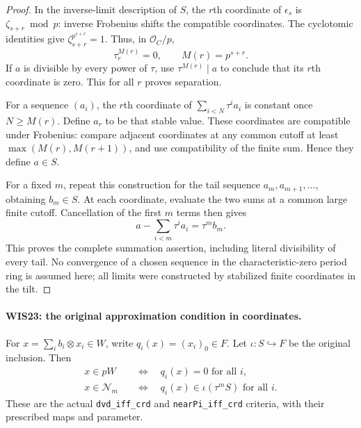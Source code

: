 \documentclass[11pt,a4paper]{article}
\numberwithin{equation}{section}
\theoremstyle{remark}\newtheorem{remark}[theorem]{Remark}
\begin{document}
\begin{proof}
In the inverse-limit description of $S$, the $r$th
coordinate of $\epsilon_s$ is
$\zeta_{s+r}\bmod p$: inverse Frobenius shifts the
compatible coordinates. The cyclotomic identities give
$\zeta_{s+r}^{p^{s+r}}=1$. Thus, in $\mathcal O_C/p$,
\[
                   \tau_r^{M(r)}=0,\qquad M(r)=p^{s+r}.
                                                               \tag{WIS.34}
\]
If $a$ is divisible by every power of $\tau$, use
$\tau^{M(r)}\mid a$ to conclude that its $r$th
coordinate is zero. This for all $r$ proves separation.

For a sequence $(a_i)$, the $r$th coordinate of
$\sum_{i<N}\tau^ia_i$ is constant once $N\geq M(r)$.
Define $a_r$ to be that stable value. These coordinates
are compatible under Frobenius: compare adjacent
coordinates at any common cutoff at least
$\max(M(r),M(r+1))$, and use compatibility of the
finite sum. Hence they define $a\in S$.

For a fixed $m$, repeat this construction for the tail
sequence $a_m,a_{m+1},\ldots$, obtaining $b_m\in S$.
At each coordinate, evaluate the two sums at a common
large finite cutoff. Cancellation of the first $m$
terms then gives
\[
                     a-\sum_{i<m}\tau^ia_i=\tau^m b_m.
 \tag{WIS.35}
\]
This proves the complete summation assertion, including
literal divisibility of every tail. No convergence of
a chosen sequence in the characteristic-zero period
ring is assumed here; all limits were constructed
by stabilized finite coordinates in the tilt.
\end{proof}

\paragraph{WIS23: the original approximation condition in coordinates.}
\label{claim:WIS23}
For $x=\sum_i b_i\otimes x_i\in W$, write
$q_i(x)=(x_i)_0\in F$. Let $\iota:S\hookrightarrow F$
be the original inclusion. Then
\[
 \begin{split}
 x\in pW&\quad\Longleftrightarrow\quad q_i(x)=0
                                      \text{ for all }i,\\
 x\in\mathcal N_m&\quad\Longleftrightarrow\quad
 q_i(x)\in\iota(\tau^mS)\text{ for all }i.
 \end{split}                                               \tag{WIS.36}
\]
These are the actual \texttt{dvd\_\allowbreak iff\_\allowbreak crd} and
\texttt{near\allowbreak Pi\_\allowbreak iff\_\allowbreak crd} criteria, with their prescribed
maps and parameter.
\end{document}
